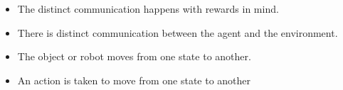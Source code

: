 \documentclass[12pt,a4paper]{article}
\begin{document}
\begin{itemize}
\item The distinct communication happens with rewards in mind.
\end{itemize}
\begin{itemize}
\item There is distinct communication between the agent and the 
environment. 
 
\end{itemize}
\begin{itemize}
\item The object or robot moves from one state to another. 
 
\end{itemize}
\begin{itemize}
\item An action is taken to move from one state to another 
\end{itemize}
\end{document}
